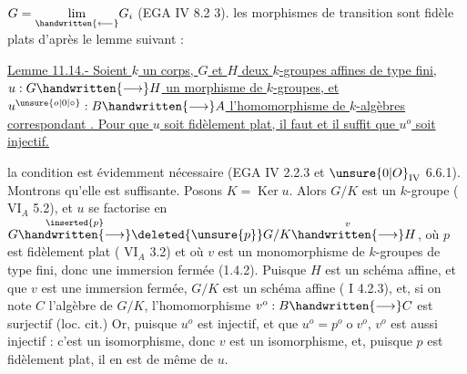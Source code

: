 
$G=\underset{\handwritten{\longleftarrow}}{\lim}G_i$ (EGA IV 8.2 3).  les morphismes de transition sont fidèle plats d'après le lemme suivant :

\uline{Lemme 11.14.- Soient $k$ un corps, $G$ et $H$ deux $k$-groupes affines de type fini, $u:G\handwritten{\longrightarrow}H$ un morphisme de $k$-groupes, et $u^{\unsure{o|0|\circ}}:B\handwritten{\longrightarrow}A$ l'homomorphisme de $k$-algèbres correspondant . Pour que $u$ soit fidèlement plat, il faut et il suffit que $u^o$ soit injectif.}

la condition est évidemment nécessaire (EGA IV 2.2.3 et $\unsure{0|O}_{\mathrm{IV}}$ 6.6.1). Montrons qu'elle est suffisante. Posons $K=\operatorname{Ker}u$. Alors $G/K$ est un $k$-groupe ( $\mathrm{VI}_A$ 5.2), et $u$ se factorise en $G\overset{\inserted{p}}{\handwritten{\longrightarrow}}\deleted{\unsure{p}}G/K\overset{v}{\handwritten{\longrightarrow}}H$, où $p$ est fidèlement plat ( $\mathrm{VI}_A$ 3.2) et où $v$ est un monomorphisme de $k$-groupes de type fini, donc une immersion fermée (1.4.2). Puisque $H$ est un schéma affine, et que $v$ est une immersion fermée, $G/K$ est un schéma affine ( I 4.2.3), et, si on note $C$ l'algèbre de $G/K$, l'homomorphisme $v^o:B\handwritten{\longrightarrow}C$ est surjectif (loc. cit.) Or, puisque $u^o$ est injectif, et que $u^o=p^o\mathbin{o}v^o$, $v^o$ est aussi injectif : c'est un isomorphisme, donc $v$ est un isomorphisme, et, puisque $p$ est fidèlement plat, il en est de même de $u$.

